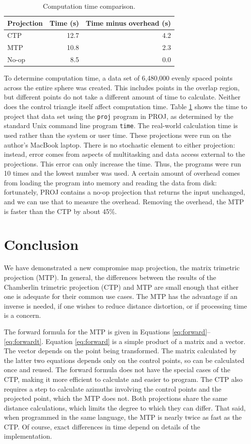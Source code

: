 \documentclass[]{interact}
\begin{document}
\begin{table}
\begin{tabular}{ l r r}
  Projection & Time (s) & Time minus overhead (s)\\
\hline
  CTP & 12.7 & 4.2 \\
  MTP & 10.8 & 2.3 \\
  No-op & 8.5 & 0.0
\end{tabular}
\caption{Computation time comparison.}
\label{table:time}
\end{table}

To determine computation time, a data set of 6,480,000 evenly spaced points
across the entire sphere was created. This includes points in the overlap
region, but different points do not take a different amount of time to
calculate. Neither does the control triangle itself affect computation time.
Table \ref{table:time} shows the time to project that data set using the
\texttt{proj} program in PROJ, as determined by the standard Unix command line
program \texttt{time}. The real-world calculation time is used rather than the
system or user time. These projections were run on the author's MacBook laptop.
There is no stochastic element to either projection: instead, error comes from
aspects of multitasking and data access external to the projections. This error
can only increase the time. Thus, the programs were run 10 times and the lowest
number was used. A certain amount of overhead comes from loading the program
into memory and reading the data from disk: fortunately, PROJ contains a no-op
projection that returns the input unchanged, and we can use that to measure the
overhead. Removing the overhead, the MTP is faster than the CTP by about 45\%.

\section{Conclusion}
We have demonstrated a new compromise map projection, the matrix trimetric
projection (MTP). In general, the differences between the results of the
Chamberlin trimetric projection (CTP) and MTP are small enough that either one
is adequate for their common use cases.
The MTP has the advantage if an inverse is needed,
if one wishes to reduce distance distortion, or if processing time is a concern.

The forward formula for the MTP is given in Equations
\ref{eq:forward}--\ref{eq:forwardt}. Equation \ref{eq:forward} is a simple
product of a matrix and a vector. The vector depends on the point being
transformed. The matrix calculated by the latter two equations depends only on
the control points, so can be calculated once and reused. The forward formula
does not have the special cases of the CTP, making it more efficient to
calculate and easier to program. The CTP also requires a step to calculate
azimuths involving the control points and the projected point,
which the MTP does not. Both projections share the same distance calculations,
which limits the degree to which they can differ. That said, when programmed in
the same language, the MTP is nearly twice as fast as the CTP. Of course,
exact differences in time depend on details of the implementation.
\end{document}
